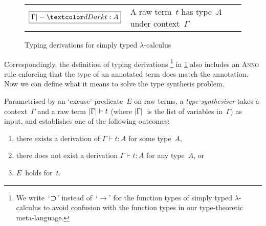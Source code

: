 \begin{figure}
  \small
  \bgroup
  \renewcommand{\arraystretch}{1.5}
  \begin{tabular}{ r l }
    $\boxed{\Gamma |- \isTerm{t} : A}$ & A raw term~$t$ has type~$A$ under context~$\Gamma$
  \end{tabular}
  \egroup
  \centering
  \caption{Typing derivations for simply typed $\lambda$-calculus}
  \label{fig:STLC-typing-derivations}
\end{figure}
Correspondingly, the definition of typing derivations%
\footnote{We write~`$\mathbin{\bm{\supset}}$' instead of~`$\to$' for the function types of simply typed $\lambda$-calculus to avoid confusion with the function types in our type-theoretic meta-language.}
in \cref{fig:STLC-typing-derivations} also includes an \textsc{Anno} rule enforcing that the type of an annotated term does match the annotation.
Now we can define what it means to solve the type synthesis problem.

\begin{defn}
\label{def:STLC-type-synthesiser}
Parametrised by an `excuse' predicate~$E$ on raw terms, a \emph{type synthesiser} takes a context~$\Gamma$ and a raw term $\left|\Gamma\right| \vdash t$ (where $\left|\Gamma\right|$~is the list of variables in~$\Gamma$) as input, and establishes one of the following outcomes:
\begin{enumerate}
\item there exists a derivation of $\Gamma \vdash t : A$ for some type~$A$,
\item there does not exist a derivation $\Gamma \vdash t : A$ for any type~$A$, or
\item $E$~holds for~$t$.
\end{enumerate}
\end{defn}

